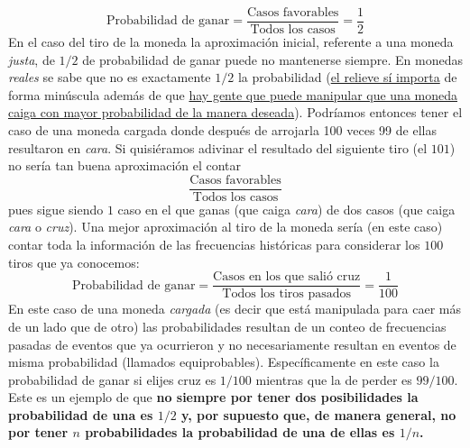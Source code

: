 \documentclass[
]{book}
\begin{document}
\[
\text{Probabilidad de ganar} = \dfrac{\text{Casos favorables}}{\text{Todos los casos}} = \dfrac{1}{2}
\]
En el caso del tiro de la moneda la aproximación inicial, referente a una moneda \emph{justa}, de \(1/2\) de probabilidad de ganar puede no mantenerse siempre. En monedas \emph{reales} se sabe que no es exactamente \(1/2\) la probabilidad (\href{https://statweb.stanford.edu/~susan/papers/headswithJ.pdf}{el relieve sí importa} de forma minúscula además de que \href{https://www.ncbi.nlm.nih.gov/pmc/articles/PMC2789164/}{hay gente que puede manipular que una moneda caiga con mayor probabilidad de la manera deseada}). Podríamos entonces tener el caso de una moneda cargada donde después de arrojarla 100 veces 99 de ellas resultaron en \emph{cara}. Si quisiéramos adivinar el resultado del siguiente tiro (el \(101\)) no sería tan buena aproximación el contar
\[
\dfrac{\text{Casos favorables}}{\text{Todos los casos}}
\]
pues sigue siendo \(1\) caso en el que ganas (que caiga \emph{cara}) de dos casos (que caiga \emph{cara} o \emph{cruz}). Una mejor aproximación al tiro de la moneda sería (en este caso) contar toda la información de las frecuencias históricas para considerar los \(100\) tiros que ya conocemos:
\[
\text{Probabilidad de ganar} =  \dfrac{\text{Casos en los que salió cruz}}{\text{Todos los tiros pasados}} = \dfrac{1}{100}
\]
En este caso de una moneda \emph{cargada} (es decir que está manipulada para caer más de un lado que de otro) las probabilidades resultan de un conteo de frecuencias pasadas de eventos que ya ocurrieron y no necesariamente resultan en eventos de misma probabilidad (llamados equiprobables). Específicamente en este caso la probabilidad de ganar si elijes cruz es \(1/100\) mientras que la de perder es \(99/100\). Este es un ejemplo de que \textbf{no siempre por tener dos posibilidades la probabilidad de una es \(1/2\) y, por supuesto que, de manera general, no por tener \(n\) probabilidades la probabilidad de una de ellas es \(1/n\).}
\end{document}
